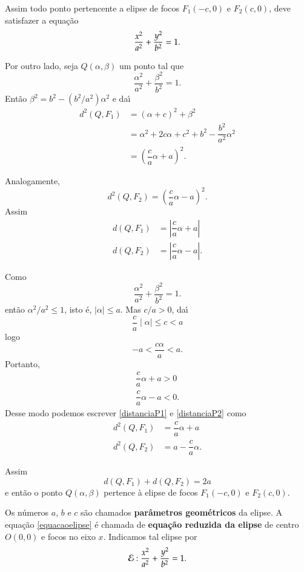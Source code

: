 Assim todo ponto pertencente a elipse de focos $F_1(-c,0)$ e $F_2(c,0)$, deve satisfazer a equa\c{c}\~ao
\[
  \dfrac{x^2}{a^2} + \dfrac{y^2}{b^2} = 1.
\]

Por outro lado, seja $Q(\alpha,\beta)$ um ponto tal que
\[
  \dfrac{\alpha^2}{a^2} + \dfrac{\beta^2}{b^2} = 1.
\]
Ent\~ao $\beta^2 = b^2 - (b^2/a^2)\alpha^2$ e da{\'\i}
\begin{align*}
  d^2(Q,F_1) &= (\alpha + c)^2 + \beta^2\\
&= \alpha^2 + 2c\alpha + c^2 + b^2 - \dfrac{b^2}{a^2}\alpha^2\\
&= \left(\dfrac{c}{a}\alpha + a\right)^2.
\end{align*}

Analogamente,
\begin{equation*}
  d^2(Q,F_2) = \left(\dfrac{c}{a}\alpha - a\right)^2.
\end{equation*}
Assim
\begin{align}
  d(Q,F_1) &= \left|\dfrac{c}{a}\alpha + a\right|\label{distanciaP1}\\
  d(Q,F_2) &= \left|\dfrac{c}{a}\alpha - a\right|\label{distanciaP2}.
\end{align}

Como
\[
  \dfrac{\alpha^2}{a^2} + \dfrac{\beta^2}{b^2} = 1.
\]
ent\~ao $\alpha^2/a^2 \le 1$, isto \'e, $\mid\alpha\mid\le a$. Mas $c/a > 0$, da{\'\i}
\[
  \dfrac{c}{a}\mid\alpha\mid \le c < a
\]
logo
\[
  -a < \dfrac{c\alpha}{a} < a.
\]
Portanto,
\begin{align*}
  \dfrac{c}{a}\alpha + a > 0\\
  \dfrac{c}{a}\alpha - a < 0.
\end{align*}
Desse modo podemos escrever \eqref{distanciaP1} e \eqref{distanciaP2} como
\begin{align*}
  d^2(Q,F_1) &= \dfrac{c}{a}\alpha + a\\
  d^2(Q,F_2) &= a - \dfrac{c}{a}\alpha.
\end{align*}

Assim
\[
  d(Q,F_1) + d(Q,F_2) = 2a
\]
e ent\~ao o ponto $Q(\alpha,\beta)$ pertence \`a elipse de focos $F_1(-c,0)$ e $F_2(c,0)$.

Os n\'umeros $a$, $b$ e $c$ s\~ao chamados \textbf{par\^ametros geom\'etricos} da elipse. A equa\c{c}\~ao \eqref{equacaoelipse} \'e chamada de \textbf{equa\c{c}\~ao reduzida da elipse} de centro $O(0,0)$ e focos no eixo $x$. Indicamos tal elipse por 
\[
  \mathcal{E}: \dfrac{x^2}{a^2} + \dfrac{y^2}{b^2} = 1.
\]

